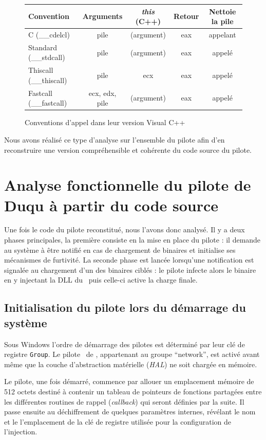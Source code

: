 \begin{figure}[h]
\begin{center}
\begin{tabular}{|l|c|c|c|c|}
\hline 
Convention & Arguments & \emph{this} (C++) & Retour & Nettoie la pile\\
\hline
C (\_\_cdelcl) & pile & (argument) & eax & appelant\\
Standard (\_\_stdcall) & pile & (argument) & eax & appelé\\
Thiscall (\_\_thiscall) & pile & ecx & eax & appelé\\
Fastcall (\_\_fastcall) & ecx, edx, pile & (argument) & eax & appelé\\
\hline
\end{tabular}
\end{center}
\caption{Conventions d'appel dans leur version Visual C++}
\label{fig:callingconvention}
\end{figure}

Nous avons réalisé ce type d'analyse sur l'ensemble du pilote afin d'en reconstruire une version compréhensible et cohérente du code source du pilote.

\section{Analyse fonctionnelle du pilote de Duqu à partir du code source}
Une fois le code du pilote reconstitué, nous l'avons donc analysé.
Il y a deux phases principales, la première consiste en la mise en place du pilote : il demande au système à être notifié en cas de chargement de binaires et initialise ses mécanismes de furtivité.
La seconde phase est lancée lorsqu'une notification est signalée au chargement d'un des binaires ciblés : le pilote infecte alors le binaire en y injectant la DLL du \duqu\ puis celle-ci active la charge finale.

\subsection{Initialisation du pilote lors du démarrage du système}
Sous Windows l'ordre de démarrage des pilotes est déterminé par leur clé de registre \texttt{Group}.
Le pilote \driver\ de \duqu, appartenant au groupe ``network'', est activé avant même que la couche d'abstraction matérielle (\emph{HAL}) ne soit chargée en mémoire.

Le pilote, une fois démarré, commence par allouer un emplacement mémoire de 512 octets destiné à contenir un tableau de pointeurs de fonctions partagées entre les différentes routines de rappel (\emph{callback}) qui seront définies par la suite.
Il passe ensuite au déchiffrement de quelques paramètres internes, révélant le nom et le l'emplacement de la clé de registre utilisée pour la configuration de l'injection.

